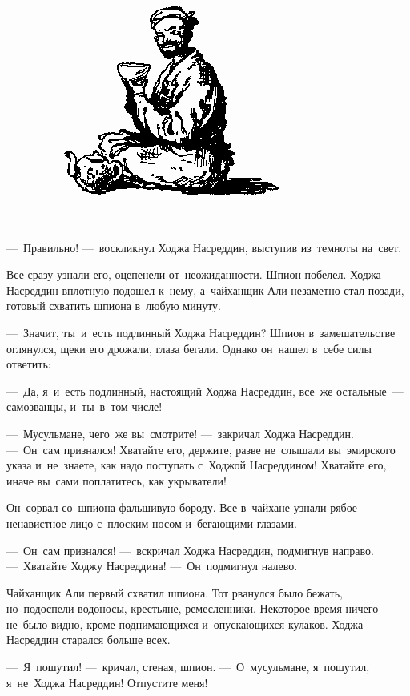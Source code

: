 \documentclass[12pt,a4paper]{book}
\begin{document}
\begin{figure}[h]
\centering
\includegraphics[scale=0.9]{15.png}
\end{figure}

—~Правильно! —~воскликнул Ходжа Насреддин, выступив из~темноты на~свет.

Все сразу узнали его, оцепенели от~неожиданности. Шпион побелел. Ходжа Насреддин вплотную подошел к~нему, а~чайханщик Али незаметно стал позади, готовый схватить шпиона в~любую минуту.

—~Значит, ты~и~есть подлинный Ходжа Насреддин? Шпион в~замешательстве оглянулся, щеки его дрожали, глаза бегали. Однако он~нашел в~себе силы ответить:

—~Да, я~и~есть подлинный, настоящий Ходжа Насреддин, все~же остальные~— самозванцы, и~ты~в~том числе!

—~Мусульмане, чего~же вы~смотрите! —~закричал Ходжа Насреддин. —~Он~сам признался! Хватайте его, держите, разве не~слышали вы~эмирского указа и~не~знаете, как надо поступать с~Ходжой Насреддином! Хватайте его, иначе вы~сами поплатитесь, как укрыватели!

Он~сорвал со~шпиона фальшивую бороду. Все в~чайхане узнали рябое ненавистное лицо с~плоским носом и~бегающими глазами.

—~Он~сам признался! —~вскричал Ходжа Насреддин, подмигнув направо. —~Хватайте Ходжу Насреддина! —~Он~подмигнул налево.

Чайханщик Али первый схватил шпиона. Тот рванулся было бежать, но~подоспели водоносы, крестьяне, ремесленники. Некоторое время ничего не~было видно, кроме поднимающихся и~опускающихся кулаков. Ходжа Насреддин старался больше всех.

—~Я~пошутил! —~кричал, стеная, шпион. —~О~мусульмане, я~пошутил, я~не~Ходжа Насреддин! Отпустите меня!
\end{document}
